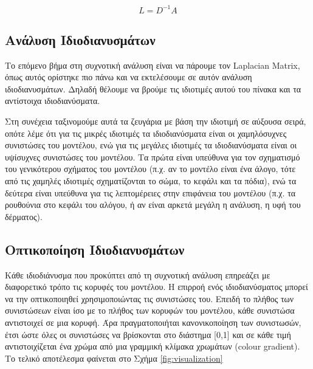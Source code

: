 \documentclass{article}
\begin{document}
\[
	L = D^{-1}A
\]

\subsection{Ανάλυση Ιδιοδιανυσμάτων}
Το επόμενο βήμα στη συχνοτική ανάλυση είναι να πάρουμε τον Laplacian Matrix,
όπως αυτός ορίστηκε πιο πάνω και να εκτελέσουμε σε αυτόν ανάλυση ιδιοδιανυσμάτων.
Δηλαδή θέλουμε να βρούμε τις ιδιοτιμές αυτού του πίνακα και τα αντίστοιχα ιδιοδιανύσματα.

Στη συνέχεια ταξινομούμε αυτά τα ζευγάρια με βάση την ιδιοτιμή σε αύξουσα σειρά,
οπότε λέμε ότι για τις μικρές ιδιοτιμές τα ιδιοδιανύσματα είναι οι χαμηλόσυχνες
συνιστώσες του μοντέλου,
ενώ για τις μεγάλες ιδιοτιμές τα ιδιοδιανύσματα είναι οι υψίσυχνες συνιστώσες του μοντέλου.
Τα πρώτα είναι υπεύθυνα για τον σχηματισμό του γενικότερου σχήματος του μοντέλου
(π.χ. αν το μοντέλο είναι ένα άλογο, τότε από τις χαμηλές ιδιοτιμές σχηματίζονται το
σώμα, το κεφάλι και τα πόδια), ενώ τα δεύτερα είναι υπεύθυνα για τις λεπτομέρειες στην
επιφάνεια του μοντέλου (π.χ. τα ρουθούνια στο κεφάλι του αλόγου,
ή αν είναι αρκετά μεγάλη η ανάλυση, η υφή του δέρματος).

\subsection{Οπτικοποίηση Ιδιοδιανυσμάτων}
Κάθε ιδιοδιάνυσμα που προκύπτει από τη συχνοτική ανάλυση επηρεάζει με διαφορετικό τρόπο
τις κορυφές του μοντέλου. Η επιρροή ενός ιδιοδιανύσματος μπορεί να την οπτικοποιηθεί
χρησιμοποιώντας τις συνιστώσες του. Επειδή το πλήθος των συνιστώσεων είναι ίσο με το
πλήθος των κορυφών του μοντέλου, κάθε συνιστώσα αντιστοιχεί σε μια κορυφή.
Άρα πραγματοποιήται κανονικοποίηση των συνιστωσών, έτσι ώστε όλες οι συνιστώσες να
βρίσκονται στο διάστημα [0,1] και σε κάθε τιμή αντιστοιχίζεται ένα χρώμα
από μια γραμμική κλίμακα χρωμάτων (colour gradient). Το τελικό αποτέλεσμα φαίνεται στο
Σχήμα \ref{fig:visualization}
\end{document}
